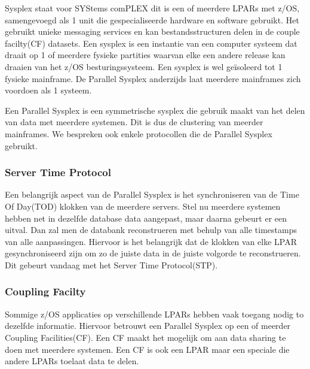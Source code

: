 Sysplex staat voor SYStems comPLEX dit is een of meerdere LPARs met z/OS, samengevoegd als 1 unit die gespecialiseerde hardware en software gebruikt. Het gebruikt unieke messaging services en kan bestandsstructuren delen in de couple facilty(CF) datasets. Een sysplex is een instantie van een computer systeem dat draait op 1 of meerdere fysieke partities waarvan elke een andere release kan draaien van het z/OS besturingssysteem. Een sysplex is wel geïsoleerd tot 1 fysieke mainframe. De Parallel Sysplex anderzijds laat meerdere mainframes zich voordoen als 1 systeem. \cite{Ebbers2011} 

Een Parallel Sysplex is een symmetrische sysplex die gebruik maakt van het delen van data met meerdere systemen. Dit is dus de clustering van meerder mainframes. We bespreken ook enkele protocollen die de Parallel Sysplex gebruikt. 

\subsubsection{Server Time Protocol}
\label{subsubsec:Server Time Protocol}

Een belangrijk aspect van de Parallel Sysplex is het synchroniseren van de Time Of Day(TOD) klokken van de meerdere servers. Stel nu meerdere systemen hebben net in dezelfde database data aangepast, maar daarna gebeurt er een uitval. Dan zal men de databank reconstrueren met behulp van alle timestamps van alle aanpassingen. Hiervoor is het belangrijk dat de klokken van elke LPAR gesynchroniseerd zijn om zo de juiste data in de juiste volgorde te reconstrueren. Dit gebeurt vandaag met het Server Time Protocol(STP). \cite{Ebbers2011}

\subsubsection{Coupling Facilty}
\label{subsubsec:Coupling Facility}

Sommige z/OS applicaties op verschillende LPARs hebben vaak toegang nodig to dezelfde informatie. Hiervoor betrouwt een Parallel Sysplex op een of meerder Coupling Facilities(CF). Een CF maakt het mogelijk om aan data sharing te doen met meerdere systemen. Een CF is ook een LPAR maar een speciale die andere LPARs toelaat data te delen. \cite{Ebbers2011}

